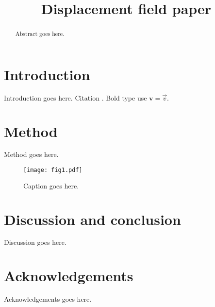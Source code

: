 \documentclass[aps,prd,twocolumn,superscriptaddress,amsfont,amssymb,amsmath,nofootinbib,showpacs,balancelastpage]{revtex4-1}
\newcommand{\bs}{\boldsymbol}
\begin{document}
\addtolength{\hoffset}{-0.525cm}
\addtolength{\textwidth}{1.05cm}
\title{Displacement field paper}




\begin{abstract}
Abstract goes here.
\end{abstract}


\maketitle

\section{Introduction}\label{sec.intro}
Introduction goes here. Citation \cite{2000ApJ...534L..19P}. Bold type use $\bs{v}=\vec{v}$.

\section{Method}\label{sec.method}
Method goes here.


\begin{figure} \centering
  \texttt{[image: fig1.pdf]}
  \caption{Caption goes here.}
  \label{fig.1}
\end{figure}


\section{Discussion and conclusion}\label{sec.discussion}
Discussion goes here.

\section*{Acknowledgements}
Acknowledgements goes here.

%


\end{document}
